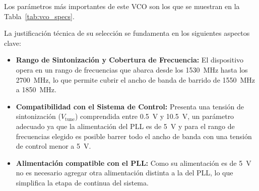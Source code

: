 Los parámetros más importantes de este VCO son los que se muestran en la Tabla~\ref{tab:vco_specs}.

\begin{table}[h]
\centering
{}
\caption{Especificaciones técnicas del VCO Crystek CVCO55BE-1530-2700 \cite{crystekVCO}.}
\label{tab:vco_specs}
\end{table}

La justificación técnica de su selección se fundamenta en los siguientes aspectos clave:
\begin{itemize}
    \item \textbf{Rango de Sintonización y Cobertura de Frecuencia:} El dispositivo opera en un rango de frecuencias que abarca desde los 1530~MHz hasta los 2700~MHz, lo que permite cubrir el ancho de banda de barrido de 1550~MHz a 1850~MHz.
    \item \textbf{Compatibilidad con el Sistema de Control:} Presenta una tensión de sintonización ($V_{\text{tune}}$) comprendida entre 0.5~V y 10.5~V, un parámetro adecuado ya que la alimentación del PLL es de 5~V y para el rango de frecuencias elegido es posible barrer todo el ancho de banda con una tensión de control menor a 5~V.
    \item \textbf{Alimentación compatible con el PLL:} Como su alimentación es de 5~V no es necesario agregar otra alimentación distinta a la del PLL, lo que simplifica la etapa de continua del sistema.
\end{itemize}


